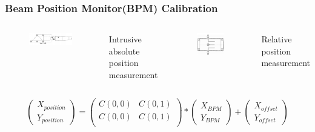 \documentclass[12pt,usenames,dvipsnames]{beamer}
\begin{document}
\begin{frame}
\frametitle{Beam Position Monitor(BPM) Calibration}

	\begin{columns}
		\begin{figure}
			\includegraphics[width=5.5cm]{../images/Thesis/harp.png}
		\end{figure}
		Intrusive absolute position measurement
		\vspace{-15pt}
		\begin{figure}
			\includegraphics[width=3.5cm]{../images/Thesis/BPM.png}
		\end{figure}
		\vspace{-15pt}
		Relative position measurement
			
	\end{columns}	
		\centering
		\begin{equation}
			\begin{pmatrix}
			X_{position}\\
			Y_{position}
			\end{pmatrix}
			=
			\begin{pmatrix}
			C(0,0) & C(0,1)\\
			C(0,0) & C(0,1)\\
			\end{pmatrix}
			*
			\begin{pmatrix}
			X_{BPM}\\
			Y_{BPM}
			\end{pmatrix}
			+
			\begin{pmatrix}
			X_{offset}\\
			Y_{offset}
			\end{pmatrix}
			\nonumber			 
		\end{equation}
		
\end{frame}
\end{document}
